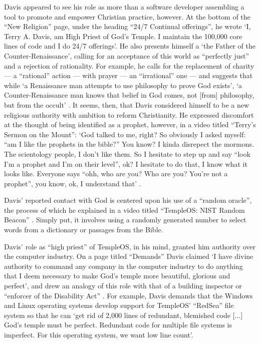 \documentclass[Draft.tex]{subfiles}
\begin{document}
Davis appeared to see his role as more than a software developer
assembling a tool to promote and empower Christian practice, however.
At the bottom of the ``New Religion'' page,
under the heading ``24/7 Continual offerings'',
he wrote `I, Terry A. Davis, am High Priest of God's Temple.
I maintain the 100,000 core lines of code and I do 24/7 offerings'.
He also presents himself a `the Father of the Counter-Renaissance',
calling for an acceptance of this world as ``perfectly just''
and a rejection of rationality.
For example, he calls for the replacement of charity
--- a ``rational'' action ---
with prayer --- an ``irrational'' one ---
and suggests that while `a Renaissance man
attempts to use philosophy to prove God exists',
`a Counter-Renaissance man knows that belief in God comes,
not [from] philosophy, but from the occult'
\parencite{CounterRenaissance}.
It seems, then, that Davis considered himself to be
a new religious authority with ambition to reform Christianity.
He expressed discomfort at the thought of being identified as a prophet,
however, in a video titled ``Terry's Sermon on the Mount'':
`God talked to me, right?
So obviously I asked myself: ``am I like the prophets in the bible?''
You know? I kinda disrepect the mormons.
The scientology people, I don't like them.
So I hesitate to step up and say ``look I'm a prophet and I'm on their level'',
ok? I hesitate to do that, I know what it looks like.
Everyone says ``ohh, who are you? Who are you? You're not a prophet'',
you know, ok, I understand that' \parencite{SermonMount}.

Davis' reported contact with God is centered upon his use of
a ``random oracle'', the process of which he explained in a video titled
``TempleOS: NIST Random Beacon'' \parencite{NIST}.
Simply put, it involves using a randomly generated number to select
words from a dictionary or passages from the Bible.

Davis' role as ``high priest'' of TempleOS, in his mind, granted him authority
over the computer industry.
On a page titled ``Demands'' Davis claimed
`I have divine authority to command any company in the computer industry
to do anything that I deem necessary
to make God's temple more beautiful, glorious and perfect',
and drew an analogy of this role with that of a building inspector
or ``enforcer of the Disability Act'' \parencite{Demands}.
For example, Davis demands that the Windows and Linux operating systems
develop support for TempleOS' ``RedSea'' file system so that he can
`get rid of 2,000 lines of redundant, blemished code [...]
God's temple must be perfect.  Redundant code for multiple file systems
is imperfect.  For this operating system, we want low line count'.
\end{document}
